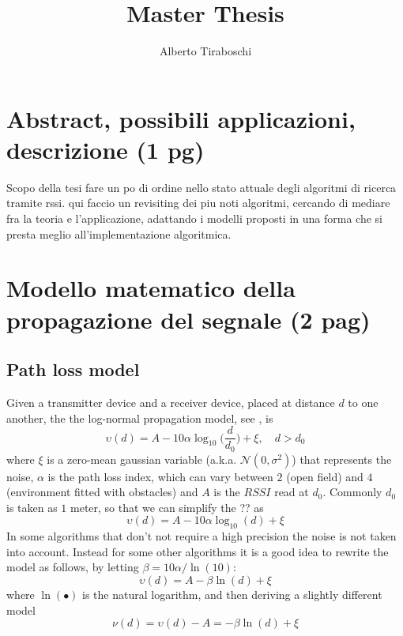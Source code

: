 \documentclass[12pt,twoside]{report}
\title{Master Thesis}
\author{Alberto Tiraboschi}
\begin{document}

\maketitle
\clearpage
\thispagestyle{empty}
\tableofcontents
\thispagestyle{empty}
\clearpage

\setcounter{page}{1}

\chapter{Abstract, possibili applicazioni, descrizione (1 pg)}
Scopo della tesi fare un po di ordine nello stato attuale degli algoritmi di ricerca tramite rssi. qui faccio un revisiting dei piu noti algoritmi, cercando di mediare fra la teoria e l'applicazione, adattando i modelli proposti in una forma che si presta meglio all'implementazione algoritmica.
\clearpage

\chapter{Modello matematico della propagazione del segnale (2 pag)}
\section{Path loss model}
Given a transmitter device and a receiver device, placed at distance $d$ to one another, the  the log-normal propagation model, see \cite{MUNOZ200923}, is
\begin{equation}
\upsilon(d) = A-10\alpha\log_{10}\bigg(\frac{d}{d_0}\bigg) + \xi, \quad d>d_0
\end{equation}
where $\xi$ is a zero-mean gaussian variable (a.k.a. $\mathcal{N}(0,\sigma^2)$) that represents the noise, $\alpha$ is the path loss index, which can vary between $2$ (open field) and $4$ (environment fitted with obstacles) and $A$ is the $RSSI$ read at $d_0$. Commonly $d_0$ is taken as $1$ meter, so that we can simplify the ?? as
\begin{equation}
\upsilon(d) = A-10\alpha\log_{10}(d) + \xi   
\end{equation}
In some algorithms that don't not require a high precision the noise is not taken into account. Instead for some other algorithms it is a good idea to rewrite the model as follows, by letting $\beta=10\alpha/\ln(10)$:
\begin{equation}
\upsilon(d) = A-\beta\ln(d) + \xi
\end{equation} where $\ln(\bullet)$ is the natural logarithm, and then deriving a slightly different model
\begin{equation}
\nu(d) = \upsilon(d)-A= -\beta\ln(d) + \xi
\end{equation}
\clearpage
\end{document}
